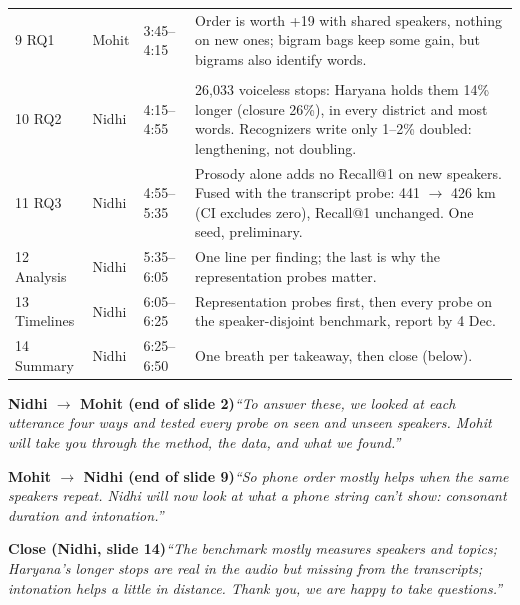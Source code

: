 \documentclass[10pt]{article}
\newcommand{\sect}[1]{\par\vspace{5pt}{\serif\bfseries\large\color{ink}#1}\par\vspace{3pt}}
\newcommand{\handover}[2]{\par\vspace{3pt}\colorbox{sage}{\parbox{\dimexpr\linewidth-2\fboxsep}{\small\textbf{\color{ink}#1}\quad\emph{#2}}}\par\vspace{3pt}}
\begin{document}
\begin{tabularx}{\linewidth}{@{}>{\raggedright}p{2.75cm} p{1.1cm} p{1.35cm} X@{}}
9 RQ1 & Mohit & 3:45--4:15 & Order is worth +19 with shared speakers, nothing on new ones; bigram bags keep some gain, but bigrams also identify words. \\
\rowcolor{sage} \multicolumn{4}{@{}l}{\textbf{Handover to Nidhi}} \\
10 RQ2 & Nidhi & 4:15--4:55 & 26,033 voiceless stops: Haryana holds them 14\% longer (closure 26\%), in every district and most words. Recognizers write only 1--2\% doubled: lengthening, not doubling. \\
11 RQ3 & Nidhi & 4:55--5:35 & Prosody alone adds no Recall@1 on new speakers. Fused with the transcript probe: 441 $\rightarrow$ 426 km (CI excludes zero), Recall@1 unchanged. One seed, preliminary. \\
12 Analysis & Nidhi & 5:35--6:05 & One line per finding; the last is why the representation probes matter. \\
13 Timelines & Nidhi & 6:05--6:25 & Representation probes first, then every probe on the speaker-disjoint benchmark, report by 4 Dec. \\
14 Summary & Nidhi & 6:25--6:50 & One breath per takeaway, then close (below). \\
\bottomrule
\end{tabularx}

\sect{Exact lines}
\handover{Nidhi $\rightarrow$ Mohit (end of slide 2)}{``To answer these, we looked at each utterance four ways and tested every probe on seen and unseen speakers. Mohit will take you through the method, the data, and what we found.''}
\handover{Mohit $\rightarrow$ Nidhi (end of slide 9)}{``So phone order mostly helps when the same speakers repeat. Nidhi will now look at what a phone string can't show: consonant duration and intonation.''}
\handover{Close (Nidhi, slide 14)}{``The benchmark mostly measures speakers and topics; Haryana's longer stops are real in the audio but missing from the transcripts; intonation helps a little in distance. Thank you, we are happy to take questions.''}
\end{document}
